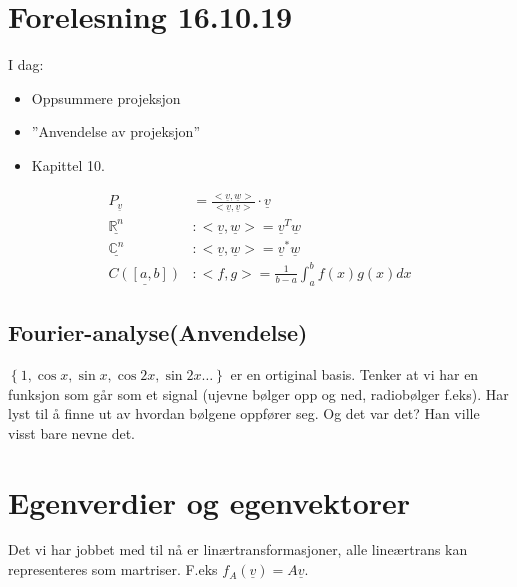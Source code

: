 \documentclass[11pt, a4paper, norsk]{article}
\begin{document}
        
        \section{Forelesning 16.10.19}
        I dag:

        \begin{itemize}
            \item Oppsummere projeksjon
            \item ''Anvendelse av projeksjon''
            \item Kapittel 10.
        \end{itemize}
                
        \begin{Formel}{}{}
            \begin{align*}
                P_{\underline{v}} &= \frac{<\underline{v}, \underline{w}>}{<\underline{v}, \underline{v}>} \cdot \underline{v}
                \\
                \underline{\mathbb{R}^n}&: <\underline{v}, \underline{w}> = \underline{v}^{T}\underline{w} \\      
                \underline{\mathbb{C}^n}&: <\underline{v}, \underline{w}> = \underline{v}^{*}\underline{w} \\
                \underline{C([a,b])}&: <f, g> = \frac{1}{b-a}\int_{a}^{b}f(x)g(x)dx
            \end{align*}
        \end{Formel}

        \subsection{Fourier-analyse(Anvendelse)}%
        \label{sub:fourier_analyse}
        
        $\left\{1, \cos{x}, \sin{x}, \cos{2x}, \sin{2x} \dots \right\}$ er en ortiginal basis. Tenker at vi har en funksjon som går som et signal (ujevne bølger opp og ned, radiobølger f.eks). Har lyst til å finne ut av hvordan bølgene oppfører seg. Og det var det? Han ville visst bare nevne det.

        \section{Egenverdier og egenvektorer}
        
        Det vi har jobbet med til nå er linærtransformasjoner, alle lineærtrans kan representeres som martriser. F.eks $f_{A}(\underline{v})= A\underline{v}$.
\end{document}
